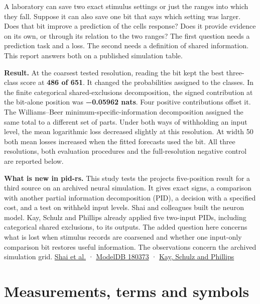 A laboratory can save two exact stimulus settings or just the ranges into which they fall. Suppose it can also save one bit that says which setting was larger. Does that bit improve a prediction of the cell\textquotesingle s response? Does it provide evidence on its own, or through its relation to the two ranges? The first question needs a prediction task and a loss. The second needs a definition of shared information. This report answers both on a published simulation table.

\textbf{Result.} At the coarsest tested resolution, reading the bit kept the best three-class score at \textbf{486 of 651}. It changed the probabilities assigned to the classes. In the finite categorical shared-exclusions decomposition, the signed contribution at the bit-alone position was \textbf{−0.05962 nats}. Four positive contributions offset it. The Williams--Beer minimum-specific-information decomposition assigned the same total to a different set of parts. Under both ways of withholding an input level, the mean logarithmic loss decreased slightly at this resolution. At width 50 both mean losses increased when the fitted forecasts used the bit. All three resolutions, both evaluation procedures and the full-resolution negative control are reported below.

\textbf{What is new in pid-rs.} This study tests the project\textquotesingle s five-position result for a third source on an archived neural simulation. It gives exact signs, a comparison with another partial information decomposition (PID), a decision with a specified cost, and a test on withheld input levels. Shai and colleagues built the neuron model. Kay, Schulz and Phillips already applied five two-input PIDs, including categorical shared exclusions, to its outputs. The added question here concerns what is lost when stimulus records are coarsened and whether one input-only comparison bit restores useful information. The observations concern the archived simulation grid. \href{https://doi.org/10.1371/journal.pcbi.1004090}{Shai et al.} · \href{https://modeldb.science/180373}{ModelDB 180373} · \href{https://doi.org/10.3390/e24081021}{Kay, Schulz and Phillips}

\clearpage

\section{Measurements, terms and symbols}\label{measurements-terms-and-symbols}

